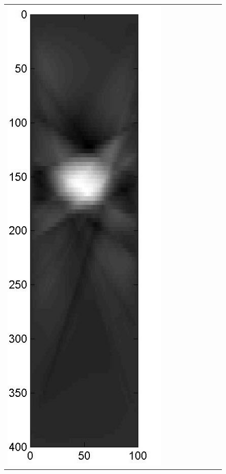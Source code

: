 \documentclass[11pt]{article}
\begin{document}
{\begin{figure}[!h]
\begin{center}
\begin{tabular}{|c|c|c|c|c|c|c|c|c|}
			\includegraphics[width=.9\iwidth]{figures/newFigs/noisy/resultsExp-3-mk}
			&

\end{tabular}
\end{center}
\end{figure}}
\end{document}
